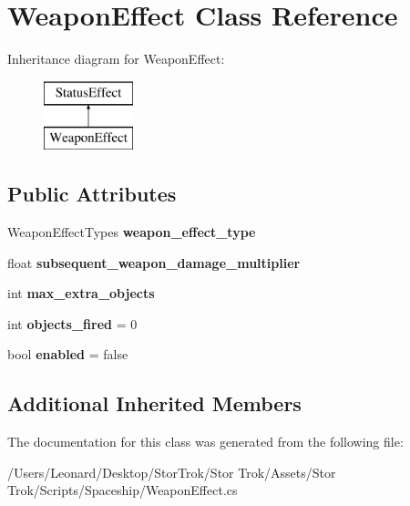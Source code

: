 \hypertarget{class_weapon_effect}{}\section{Weapon\+Effect Class Reference}
\label{class_weapon_effect}
Inheritance diagram for Weapon\+Effect\+:\begin{figure}[H]
\begin{center}
\leavevmode
\includegraphics[height=2.000000cm]{class_weapon_effect}
\end{center}
\end{figure}
\subsection*{Public Attributes}
\begin{DoxyCompactItemize}
\item 
\mbox{\label{class_weapon_effect_a7099a6070aa7f2530d83f817e5880643}} 
Weapon\+Effect\+Types {\bfseries weapon\+\_\+effect\+\_\+type}
\item 
\mbox{\label{class_weapon_effect_a85c9f9dfd823f4481660ee333b91043b}} 
float {\bfseries subsequent\+\_\+weapon\+\_\+damage\+\_\+multiplier}
\item 
\mbox{\label{class_weapon_effect_a8212043eead35a3ccbb6ee06b72e74fe}} 
int {\bfseries max\+\_\+extra\+\_\+objects}
\item 
\mbox{\label{class_weapon_effect_a90a8259959f8baa1530e8ac4e5b61aa0}} 
int {\bfseries objects\+\_\+fired} = 0
\item 
\mbox{\label{class_weapon_effect_a3c58891e60c56237a3640a79a91d28da}} 
bool {\bfseries enabled} = false
\end{DoxyCompactItemize}
\subsection*{Additional Inherited Members}


The documentation for this class was generated from the following file\+:\begin{DoxyCompactItemize}
\item 
/\+Users/\+Leonard/\+Desktop/\+Stor\+Trok/\+Stor Trok/\+Assets/\+Stor Trok/\+Scripts/\+Spaceship/Weapon\+Effect.\+cs\end{DoxyCompactItemize}
